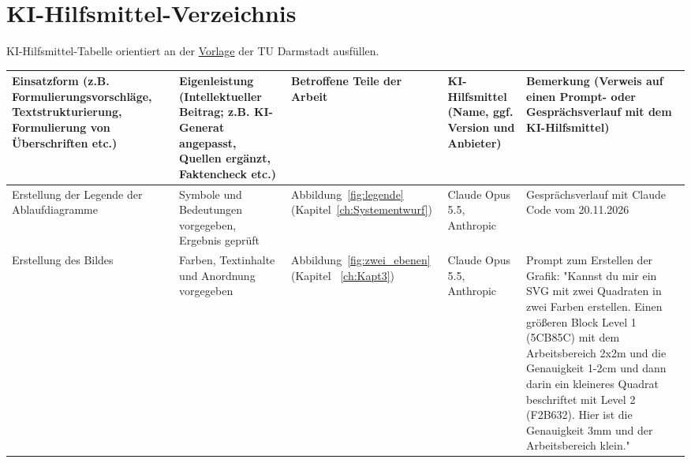 \documentclass[
	thesis={type=msc}, %
	class=report,%
	ruledheaders=section,%
	accentcolor=1b, %
	marginpar=false,%
	parskip=half-,%
	fontsize=11pt,%
	IMRAD=false, %
]{tudapub}
\begin{document}








\cleardoublepage
\ifdocenglish
    \printbibliography[title={Bibliography}]
\else
    \printbibliography[title={Literaturverzeichnis}]
\fi
\cleardoublepage

\chapter*{KI-Hilfsmittel-Verzeichnis}

KI-Hilfsmittel-Tabelle orientiert an der \href{https://www.ulb.tu-darmstadt.de/media/ulb/forschen_publizieren/ki/ki_empfehlung_kurz.de.pdf}{Vorlage} der TU Darmstadt ausfüllen.

\begin{longtable}{|p{}|p{}|p{}|p{}|p{}|}
\hline
\rowcolor[HTML]{C0C0C0} 
{\color[HTML]{DEDEDE} } \textbf{Einsatzform} \; (z.B. Formulierungsvorschläge, Textstrukturierung, Formulierung von Überschriften etc.) & {\color[HTML]{DEDEDE} } \textbf{Eigenleistung} (Intellektueller Beitrag; z.B. KI-Generat angepasst, Quellen ergänzt, Faktencheck etc.) & {\color[HTML]{DEDEDE} } \textbf{Betroffene
Teile der Arbeit} & {\color[HTML]{DEDEDE}}\textbf{KI-Hilfsmittel} \; (Name, ggf. Version und Anbieter) & {\color[HTML]{DEDEDE}} \textbf{Bemerkung} \;\; (Verweis auf einen Prompt- oder Gesprächsverlauf mit dem KI-Hilfsmittel)
 \\ \hline
\endfirsthead
\endhead
Erstellung der Legende der Ablaufdiagramme & Symbole und Bedeutungen vorgegeben, Ergebnis geprüft & Abbildung~\ref{fig:legende} (Kapitel~\ref{ch:Systementwurf}) & Claude Opus 5.5, Anthropic & Gesprächsverlauf mit Claude Code vom 20.11.2026 \\ \hline

Erstellung des Bildes & Farben, Textinhalte und Anordnung vorgegeben & Abbildung~\ref{fig:zwei_ebenen} (Kapitel ~\ref{ch:Kapt3}) & Claude Opus 5.5, Anthropic & Prompt zum Erstellen der Grafik: "Kannst du mir ein SVG mit zwei Quadraten in zwei Farben erstellen. Einen größeren Block Level 1 (5CB85C) mit dem Arbeitsbereich 2x2m und die Genauigkeit 1-2cm und dann darin ein kleineres Quadrat beschriftet mit Level 2 (F2B632). Hier ist die Genauigkeit 3mm und der Arbeitsbereich klein."


\end{longtable}   
\end{document}
